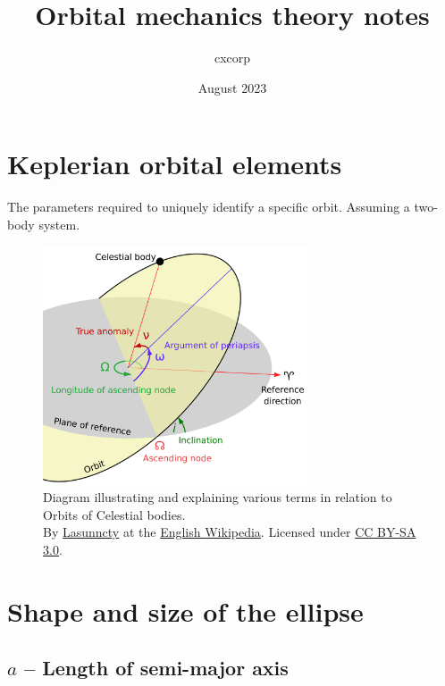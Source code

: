 \documentclass{article}
\title{Orbital mechanics theory notes}
\author{cxcorp}
\date{August 2023}
\begin{document}
\maketitle

\tableofcontents

\pagebreak

\section{Keplerian orbital elements}

The parameters required to uniquely identify a specific orbit. Assuming a two-body system.

\begin{figure}[htp]
    \centering
    \includegraphics[width=0.7\textwidth]{img/Orbit1.svg.png}
    \caption{Diagram illustrating and explaining various terms in relation to Orbits of Celestial bodies. \\ {\small By \href{https://en.wikipedia.org/wiki/User:Lasunncty}{Lasunncty} at the \href{https://en.wikipedia.org/wiki/}{English Wikipedia}. Licensed under \href{http://creativecommons.org/licenses/by-sa/3.0/}{CC BY-SA 3.0}.}}
\end{figure}




\section{Shape and size of the ellipse}

\subsection{$a$ -- Length of semi-major axis}
\label{sec:semimajor}
\end{document}
